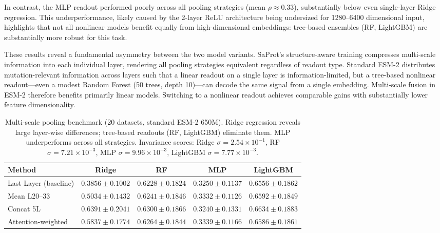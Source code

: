 \documentclass[11pt,a4paper]{article}
\begin{document}
In contrast, the MLP readout performed poorly across all pooling strategies
(mean $\rho \approx 0.33$), substantially below even single-layer Ridge
regression. This underperformance, likely caused by the 2-layer ReLU architecture
being undersized for 1280--6400 dimensional input, highlights that
not all nonlinear models benefit equally from high-dimensional embeddings:
tree-based ensembles (RF, LightGBM) are substantially more robust for this task.

These results reveal a fundamental asymmetry between the two model variants.
SaProt's structure-aware training compresses multi-scale information into each
individual layer, rendering all pooling strategies equivalent regardless of
readout type. Standard ESM-2 distributes mutation-relevant information across
layers such that a linear readout on a single layer is information-limited, but
a tree-based nonlinear readout---even a modest Random Forest (50 trees, depth
10)---can decode the same signal from a single embedding. Multi-scale fusion in ESM-2 therefore benefits primarily linear models.
Switching to a nonlinear readout achieves comparable gains with substantially
lower feature dimensionality.

\begin{table}[ht]
\centering
\caption{Multi-scale pooling benchmark (20 datasets, standard ESM-2 650M).
Ridge regression reveals large layer-wise differences; tree-based readouts (RF, LightGBM)
eliminate them. MLP underperforms across all strategies. Invariance scores: Ridge
$\sigma = 2.54 \times 10^{-1}$, RF $\sigma = 7.21 \times 10^{-3}$,
MLP $\sigma = 9.96 \times 10^{-3}$, LightGBM $\sigma = 7.77 \times 10^{-3}$.}
\label{tab:pooling_esm2}
\begin{tabular}{lcccc}
\toprule
Method & Ridge & RF & MLP & LightGBM \\
\midrule
Last Layer (baseline) & $0.3856 \pm 0.1002$ & $0.6228 \pm 0.1824$ & $0.3250 \pm 0.1137$ & $0.6556 \pm 0.1862$ \\
Mean L20--33          & $0.5034 \pm 0.1432$ & $0.6241 \pm 0.1846$ & $0.3332 \pm 0.1126$ & $0.6592 \pm 0.1849$ \\
Concat 5L             & $0.6391 \pm 0.2041$ & $0.6300 \pm 0.1866$ & $0.3240 \pm 0.1331$ & $0.6634 \pm 0.1883$ \\
Attention-weighted    & $0.5837 \pm 0.1774$ & $0.6264 \pm 0.1844$ & $0.3339 \pm 0.1166$ & $0.6586 \pm 0.1861$ \\
\bottomrule
\end{tabular}
\end{table}
\end{document}
